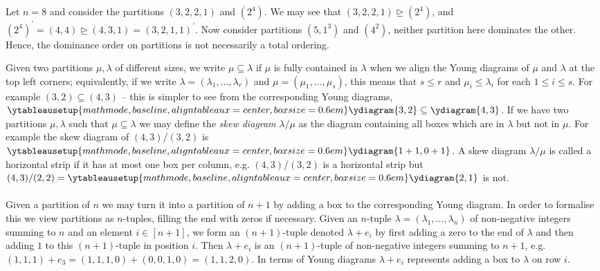 \documentclass[11pt]{report}
\begin{document}
\begin{example}
	Let $n=8$ and consider the partitions $(3,2,2,1)$ and $(2^{4})$. We may see that $(3,2,2,1) \trianglerighteq (2^{4})$, and  $(2^{4})^{\prime} = (4,4) \trianglerighteq(4,3,1)= (3,2,1,1)^{\prime}$. Now consider partitions $(5,1^{3})$ and $(4^{2})$, neither partition here dominates the other. Hence, the dominance order on partitions is not necessarily a total ordering. 	
	
	
\end{example}


Given two partitions $\mu,\lambda$ of different sizes, we 
write $\mu \subseteq \lambda$ if $\mu$ is fully contained in $\lambda$ when 
we 
align the Young diagrams of $\mu$ and $\lambda$ at the top left corners;
equivalently, if we write $\lambda = (\lambda_1,\dots,\lambda_r)$ and 
$\mu=(\mu_1,\dots,\mu_s)$, 
this means that $s\leq r$ and $\mu_i\leq \lambda_i$ for each $1\leq i \leq 
s$. For example $(3,2) \subseteq (4,3)$ -- this is simpler to see from the 
corresponding Young diagrams, 
$\ytableausetup{mathmode,baseline,aligntableaux=center,boxsize=0.6em}
\ydiagram{3,2} \subseteq \ydiagram{4,3}$.
If we have two partitions $\mu,\lambda$ such that $\mu \subseteq \lambda$ we 
may define the \emph{skew diagram} $\lambda/\mu$ as the diagram containing all  
boxes which are in $\lambda$ but not in $\mu$. For example the skew diagram 
of $ (4,3)/(3,2)$ is 
$\ytableausetup{mathmode,baseline,aligntableaux=center,boxsize=0.6em} 
\ydiagram{1+1,0+1}$. A skew diagram $\lambda / \mu$ is called a horizontal 
strip if it has at most one box per column, e.g. $(4,3)/(3,2)$ is a 
horizontal strip but $(4,3)/(2,2) = \ytableausetup{mathmode,baseline,aligntableaux=center,boxsize=0.6em} 
\ydiagram{2,1}$ is not.
\paragraph{}
Given a partition of $n$ we may turn it into a partition of $n+1$ by adding a box to the corresponding Young diagram. In order to formalise this we view partitions as $n$-tuples, filling the end with zeros if necessary.	Given an $n$-tuple $\lambda=(\lambda_1,\ldots,\lambda_n)$ of non-negative 		integers summing to $n$ and an element $i \in [n+1]$, we form an $(n+1)$-tuple denoted $\lambda+e_i$ by first adding a zero to the end 	of 	$\lambda$ and then adding $1$ to this $(n+1)$-tuple in position $i$. Then $\lambda+e_i$ is an $(n+1)$-tuple of non-negative integers summing to $n+1$, e.g. $(1,1,1) + e_{3} = (1,1,1,0) + (0,0,1,0) = (1,1,2,0)$.
In terms of Young diagrams $\lambda +e_{i}$ represents adding a box to $\lambda$ on row $i$. 
\end{document}
